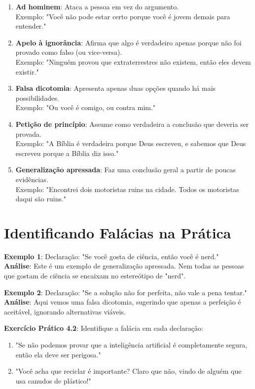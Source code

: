 \documentclass[a4paper,12pt]{book}
\begin{document}
\begin{enumerate}
    \item \textbf{Ad hominem}: Ataca a pessoa em vez do argumento.\\
    Exemplo: "Você não pode estar certo porque você é jovem demais para entender."
    \item \textbf{Apelo à ignorância}: Afirma que algo é verdadeiro apenas porque não foi provado como falso (ou vice-versa).\\
    Exemplo: "Ninguém provou que extraterrestres não existem, então eles devem existir."
    \item \textbf{Falsa dicotomia}: Apresenta apenas duas opções quando há mais possibilidades.\\
    Exemplo: "Ou você é comigo, ou contra mim."
    \item \textbf{Petição de princípio}: Assume como verdadeira a conclusão que deveria ser provada.\\
    Exemplo: "A Bíblia é verdadeira porque Deus escreveu, e sabemos que Deus escreveu porque a Bíblia diz isso."
    \item \textbf{Generalização apressada}: Faz uma conclusão geral a partir de poucas evidências.\\
    Exemplo: "Encontrei dois motoristas ruins na cidade. Todos os motoristas daqui são ruins."
\end{enumerate}

\newpage

\section{Identificando Falácias na Prática}

\textbf{Exemplo 1}:  
Declaração: "Se você gosta de ciência, então você é nerd."\\
\textbf{Análise}: Este é um exemplo de generalização apressada. Nem todas as pessoas que gostam de ciência se encaixam no estereótipo de "nerd".

\textbf{Exemplo 2}:  
Declaração: "Se a solução não for perfeita, não vale a pena tentar."\\
\textbf{Análise}: Aqui vemos uma falsa dicotomia, sugerindo que apenas a perfeição é aceitável, ignorando alternativas viáveis.


\textbf{Exercício Prático 4.2}: Identifique a falácia em cada declaração:
\begin{enumerate}
    \item "Se não podemos provar que a inteligência artificial é completamente segura, então ela deve ser perigosa."
    \item "Você acha que reciclar é importante? Claro que não, vindo de alguém que usa canudos de plástico!"
\end{enumerate}
\end{document}
